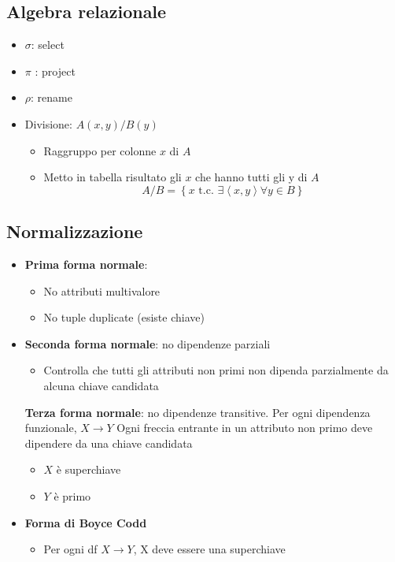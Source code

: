 \subsection{Algebra relazionale}
\begin{itemize}
  \item $ \sigma  $: select
  \item $ \pi  $ : project
  \item $ \rho  $: rename
  \item Divisione: $ A\left(x, y\right) / B\left(y\right) $
      \begin{itemize}
        \item Raggruppo per colonne $ x $ di $ A $
        \item Metto in tabella risultato gli $ x $ che hanno tutti gli y di $ A $
          \[
            A / B = \left\{x \text{ t.c. } \exists \left<x,y\right> \forall y \in B \right\}
          \]
      \end{itemize}
\end{itemize}
\subsection{Normalizzazione}
\begin{itemize}
  \item \textbf{Prima forma normale}: 
    \begin{itemize}
      \item No attributi multivalore
      \item No tuple duplicate (esiste chiave)
    \end{itemize}
  \item \textbf{Seconda forma normale}: no dipendenze parziali
    \begin{itemize}
      \item Controlla che tutti gli attributi non primi non dipenda parzialmente da alcuna chiave candidata
    \end{itemize}
    \textbf{Terza forma normale}: no dipendenze transitive. Per ogni dipendenza funzionale, $ X \rightarrow Y $
    \vskip3mm 
    Ogni freccia entrante in un attributo non primo deve dipendere da una chiave candidata
    \begin{itemize}
      \item $ X $ è superchiave
      \item $ Y $ è primo
    \end{itemize}
  \item \textbf{Forma di Boyce Codd}
    \begin{itemize}
      \item Per ogni df $ X \rightarrow Y $, X deve essere una superchiave
    \end{itemize}
\end{itemize}

